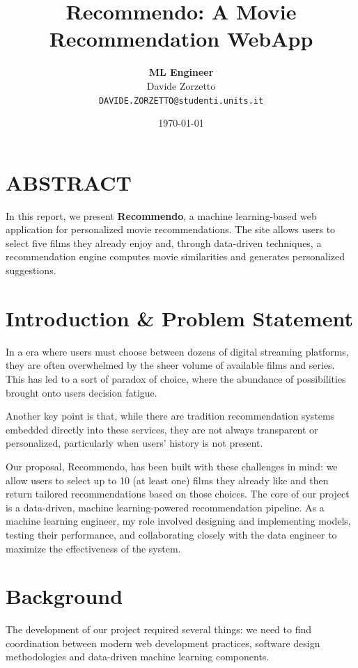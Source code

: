 \documentclass{article}
\title{\textbf{Recommendo:} A Movie Recommendation WebApp}
\author{
    \textbf{ML Engineer} \\
    Davide Zorzetto \\
    \texttt{DAVIDE.ZORZETTO@studenti.units.it}
}
\date{\today}
\begin{document}
\twocolumn
\maketitle



\section*{ABSTRACT}

In this report, we present \textbf{Recommendo}, a machine learning-based web application for personalized movie recommendations. The site allows users to select five films they already enjoy and, through data-driven techniques, a recommendation engine computes movie similarities and generates personalized suggestions.


\section*{Introduction \& Problem Statement}
In a era  where users must choose between dozens of digital streaming platforms, they are often overwhelmed by the sheer volume of available films and series. This has led to a sort of paradox of choice,  where the abundance of possibilities brought onto users decision fatigue. 

Another key point is that, while there are tradition recommendation systems embedded directly into these services, they are not always transparent or personalized, particularly when users’ history is not present.

Our proposal, Recommendo, has been built with these challenges in mind: we allow users to select up to 10 (at least one) films they already like and then return tailored recommendations based on those choices. The core of our project is a data-driven, machine learning-powered recommendation pipeline.
As a machine learning engineer, my role involved designing and implementing models, testing their performance, and collaborating closely with the data engineer to maximize the effectiveness of the system.



\section*{Background}
The development of our project required several things: we need to find coordination between modern web development practices, software design methodologies and data-driven machine learning components. 
\end{document}
